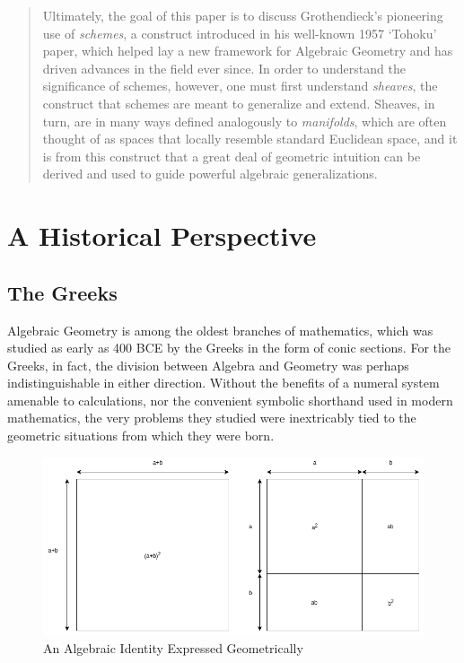 \documentclass{article}
\theoremstyle{definition}
\begin{document}
\begin{abstract}
Ultimately, the goal of this paper is to discuss
Grothendieck's pioneering use of \emph{schemes}, a construct introduced
in his well-known 1957 `Tohoku' paper, which helped lay a new framework
for Algebraic Geometry and has driven advances in the field ever since. In
order to understand the significance of schemes, however, one must first
understand \emph{sheaves}, the construct that schemes are meant to
generalize and extend. Sheaves, in turn, are in many ways defined
analogously to \emph{manifolds}, which are often thought of as spaces
that locally resemble standard Euclidean space, and it is from this
construct that a great deal of geometric intuition can be derived and
used to guide powerful algebraic generalizations.
\end{abstract}

\newpage

\section{A Historical Perspective}\label{header-n30}

\subsection{The Greeks}\label{header-n31}

Algebraic Geometry is among the oldest branches of mathematics, which was
studied as early as 400 BCE by the Greeks in the form of conic sections.
For the Greeks, in fact, the division between Algebra and Geometry was
perhaps indistinguishable in either direction. Without the benefits of a
numeral system amenable to calculations, nor the convenient symbolic
shorthand used in modern mathematics, the very problems they studied
were inextricably tied to the geometric situations from which they were
born.

\begin{figure}[H]
\centering
\includegraphics[width=\linewidth]{identity.png}
\caption{An Algebraic Identity Expressed Geometrically}
\label{fig:my_label19}
\end{figure}
\end{document}

